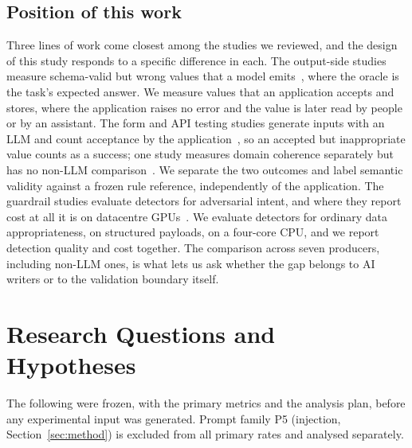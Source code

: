 \documentclass[conference]{IEEEtran}
\begin{document}
\subsection{Position of this work}
Three lines of work come closest among the studies we reviewed, and the design of this study responds
to a specific difference in each. The output-side studies measure schema-valid but wrong values that a
model emits~\cite{li2026orderbench,ray2026constrainttax,singh2026sob,wrenn2026enterprise}, where the
oracle is the task's expected answer. We measure values that an application accepts and stores, where
the application raises no error and the value is later read by people or by an assistant. The form and
API testing studies generate inputs with an LLM and count acceptance by the
application~\cite{alian2024formnexus,li2026webformtest}, so an accepted but inappropriate value counts
as a success; one study measures domain coherence separately but has no non-LLM
comparison~\cite{kim2025llamaresttest}. We separate the two outcomes and label semantic validity
against a frozen rule reference, independently of the application. The guardrail studies evaluate
detectors for adversarial intent, and where they report cost at all it is on datacentre
GPUs~\cite{ahmed2026reflexguard,saleem2026layered}. We evaluate detectors for ordinary data
appropriateness, on structured payloads, on a four-core CPU, and we report detection quality and cost
together. The comparison across seven producers, including non-LLM ones, is what lets us ask whether
the gap belongs to AI writers or to the validation boundary itself.

\section{Research Questions and Hypotheses}
\label{sec:rq}

The following were frozen, with the primary metrics and the analysis plan, before any experimental
input was generated. Prompt family P5 (injection, Section~\ref{sec:method}) is excluded from all
primary rates and analysed separately.
\end{document}

